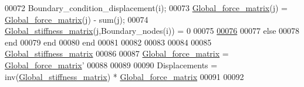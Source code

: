 \begin{DoxyCode}
00072                 Boundary\_condition\_displacement(i);
00073             \hyperlink{L02_2main_8m_a22c0511a90736f47a39b47581e1b823e}{Global\_force\_matrix}(j) = \hyperlink{L02_2main_8m_a22c0511a90736f47a39b47581e1b823e}{Global\_force\_matrix}(j) - sum(j);
00074             \hyperlink{GeoTech_2BC_2main_8m_a31cdcce530a93925f9b8c6349e94e70b}{Global\_stiffness\_matrix}(j,Boundary\_nodes(i)) = 0
00075         %
\hypertarget{L02_2main_8m_source_l00076}{}\hyperlink{L02_2main_8m_ab56a0e8dabe1e9e6a7fd6913e6448220}{00076}         %
00077         else
00078         end
00079     end
00080 end
00081 
00082 %
00083 
00084 %
00085 \hyperlink{GeoTech_2BC_2main_8m_a31cdcce530a93925f9b8c6349e94e70b}{Global\_stiffness\_matrix} 
00086 %
00087 \hyperlink{L02_2main_8m_a22c0511a90736f47a39b47581e1b823e}{Global\_force\_matrix} = \hyperlink{L02_2main_8m_a22c0511a90736f47a39b47581e1b823e}{Global\_force\_matrix}' 
00088 
00089 %
00090 Displacements = inv(\hyperlink{GeoTech_2BC_2main_8m_a31cdcce530a93925f9b8c6349e94e70b}{Global\_stiffness\_matrix}) * 
      \hyperlink{L02_2main_8m_a22c0511a90736f47a39b47581e1b823e}{Global\_force\_matrix}
00091 
00092 %
\end{DoxyCode}
